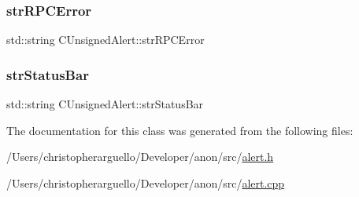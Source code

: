 \subsubsection{\texorpdfstring{str\+R\+P\+C\+Error}{strRPCError}}
{\footnotesize\ttfamily std\+::string C\+Unsigned\+Alert\+::str\+R\+P\+C\+Error}

\mbox{\label{class_c_unsigned_alert_a97cfbf9a49b770bb84e49389ac1489c2}} 
\subsubsection{\texorpdfstring{str\+Status\+Bar}{strStatusBar}}
{\footnotesize\ttfamily std\+::string C\+Unsigned\+Alert\+::str\+Status\+Bar}



The documentation for this class was generated from the following files\+:\begin{DoxyCompactItemize}
\item 
/\+Users/christopherarguello/\+Developer/anon/src/\mbox{\hyperlink{alert_8h}{alert.\+h}}\item 
/\+Users/christopherarguello/\+Developer/anon/src/\mbox{\hyperlink{alert_8cpp}{alert.\+cpp}}\end{DoxyCompactItemize}
